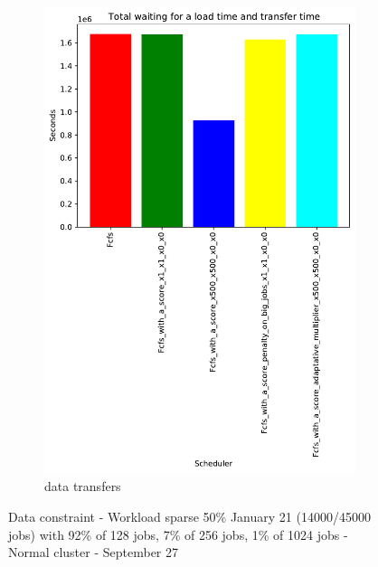 \documentclass[a4paper]{article}
\begin{document}
\begin{figure}[H]
\begin{subfigure}[b]{0.4\linewidth}\centering\includegraphics[width=0.9\linewidth]{MBSS/plot/Results_FCFS_Score_Adaptative_Multiplier_2022-01-21->2022-01-21_V9271_sparse_50_Total_waiting_for_a_load_time_and_transfer_time_450_128_32_256_4_1024.pdf}\caption{data transfers}\end{subfigure}
\caption{Data constraint - Workload sparse 50\% January 21 (14000/45000 jobs) with 92\% of 128 jobs, 7\% of 256 jobs, 1\% of 1024 jobs - Normal cluster - September 27}\end{figure}
\end{document}

